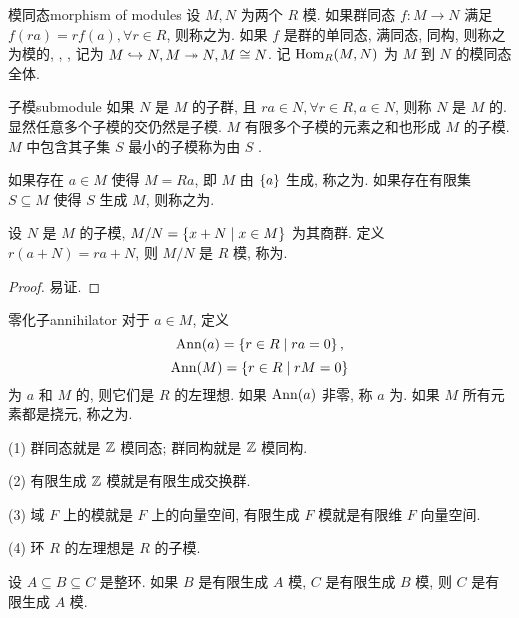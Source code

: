 \begin{definition}{模同态}{morphism of modules}
设 $M,N$ 为两个 $R$ 模. 如果群同态 $f:M\to N$ 满足 $f(ra)=rf(a),\forall r\in R$, 则称之为. 如果 $f$ 是群的单同态, 满同态, 同构, 则称之为模的, , , 记为 $M\hookrightarrow N, M\twoheadrightarrow N, M\cong N$. 记 ${\mathrm{Hom}}_R(M,N)$ 为 $M$ 到 $N$ 的模同态全体.
\end{definition}

\begin{definition}{子模}{submodule}
如果 $N$ 是 $M$ 的子群, 且 $ra\in N,\forall r\in R,a\in N$, 则称 $N$ 是 $M$ 的. 显然任意多个子模的交仍然是子模. $M$ 有限多个子模的元素之和也形成 $M$ 的子模. $M$ 中包含其子集 $S$ 最小的子模称为由 $S$ .

如果存在 $a\in M$ 使得 $M=Ra$, 即 $M$ 由 $\left\{a\right\}$ 生成, 称之为. 如果存在有限集 $S\subseteq M$ 使得 $S$ 生成 $M$, 则称之为.
\end{definition}

\begin{proposition}{}{}
设 $N$ 是 $M$ 的子模, $M/N=\left\{x+N\mid x\in M\right\}$ 为其商群. 定义 $r(a+N)=ra+N$, 则 $M/N$ 是 $R$ 模, 称为.
\end{proposition}
\begin{proof}
易证.
\end{proof}

\begin{definition}{零化子}{annihilator}
对于 $a\in M$, 定义 
  \[{\mathrm{Ann}}(a)=\left\{r\in R\mid ra=0\right\},\]
  \[{\mathrm{Ann}}(M)=\left\{r\in R\mid rM=0\right\}\]
为 $a$ 和 $M$ 的, 则它们是 $R$ 的左理想. 如果 ${\mathrm{Ann}}(a)$ 非零, 称 $a$ 为. 如果 $M$ 所有元素都是挠元, 称之为.
\end{definition}

\begin{example}
(1) 群同态就是 ${\mathbb{Z}}$ 模同态; 群同构就是 ${\mathbb{Z}}$ 模同构.

(2) 有限生成 ${\mathbb{Z}}$ 模就是有限生成交换群.

(3) 域 $F$ 上的模就是 $F$ 上的向量空间, 有限生成 $F$ 模就是有限维 $F$ 向量空间.

(4) 环 $R$ 的左理想是 $R$ 的子模.
\end{example}

\begin{exercise}
设 $A\subseteq B\subseteq C$ 是整环. 如果 $B$ 是有限生成 $A$ 模, $C$ 是有限生成 $B$ 模, 则 $C$ 是有限生成 $A$ 模.
\end{exercise}

